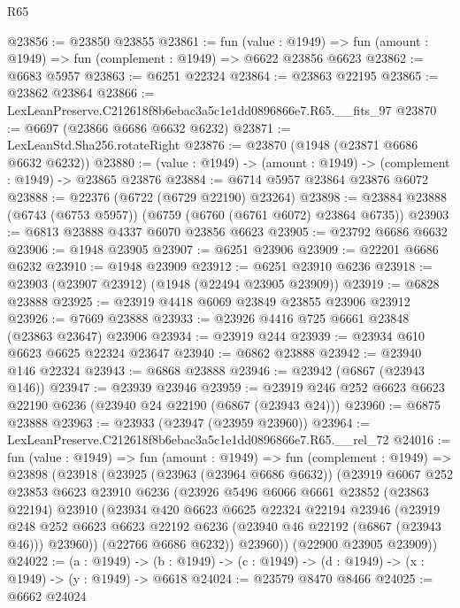 \begin{lexlean}{R65}
\begin{coremodule}
{@23856 := @23850 @23855
@23861 := fun (value : @1949) =>
  fun (amount : @1949) => fun (complement : @1949) => @6622 @23856 @6623
@23862 := @6683 @5957
@23863 := @6251 @22324
@23864 := @23863 @22195
@23865 := @23862 @23864
@23866 := LexLeanPreserve.C212618f8b6ebac3a5c1e1dd0896866e7.R65.__fits_97
@23870 := @6697 (@23866 @6686 @6632 @6232)
@23871 := LexLeanStd.Sha256.rotateRight
@23876 := @23870 (@1948 (@23871 @6686 @6632 @6232))
@23880 := (value : @1949) -> (amount : @1949) -> (complement : @1949) -> @23865 @23876
@23884 := @6714 @5957 @23864 @23876 @6072
@23888 := @22376 (@6722 (@6729 @22190) @23264)
@23898 := @23884 @23888 (@6743 (@6753 @5957)) (@6759 (@6760 (@6761 @6072) @23864 @6735))
@23903 := @6813 @23888 @4337 @6070 @23856 @6623
@23905 := @23792 @6686 @6632
@23906 := @1948 @23905
@23907 := @6251 @23906
@23909 := @22201 @6686 @6232
@23910 := @1948 @23909
@23912 := @6251 @23910 @6236
@23918 := @23903 (@23907 @23912) (@1948 (@22494 @23905 @23909))
@23919 := @6828 @23888
@23925 := @23919 @4418 @6069 @23849 @23855 @23906 @23912
@23926 := @7669 @23888
@23933 := @23926 @4416 @725 @6661 @23848 (@23863 @23647) @23906
@23934 := @23919 @244
@23939 := @23934 @610 @6623 @6625 @22324 @23647
@23940 := @6862 @23888
@23942 := @23940 @146 @22324
@23943 := @6868 @23888
@23946 := @23942 (@6867 (@23943 @146))
@23947 := @23939 @23946
@23959 := @23919 @246 @252 @6623 @6623 @22190 @6236 (@23940 @24 @22190 (@6867 (@23943 @24)))
@23960 := @6875 @23888
@23963 := @23933 (@23947 (@23959 @23960))
@23964 := LexLeanPreserve.C212618f8b6ebac3a5c1e1dd0896866e7.R65.__rel_72
@24016 := fun (value : @1949) =>
  fun (amount : @1949) =>
  fun (complement : @1949) =>
  @23898
    (@23918
      (@23925
        (@23963 (@23964 @6686 @6632))
        (@23919
          @6067
          @252
          @23853
          @6623
          @23910
          @6236
          (@23926
            @5496
            @6066
            @6661
            @23852
            (@23863 @22194)
            @23910
            (@23934
              @420
              @6623
              @6625
              @22324
              @22194
              @23946
              (@23919
                @248
                @252
                @6623
                @6623
                @22192
                @6236
                (@23940 @46 @22192 (@6867 (@23943 @46)))
                @23960))
            (@22766 @6686 @6232))
          @23960))
      (@22900 @23905 @23909))
@24022 := (a : @1949) ->
  (b : @1949) -> (c : @1949) -> (d : @1949) -> (x : @1949) -> (y : @1949) -> @6618
@24024 := @23579 @8470 @8466
@24025 := @6662 @24024
}
\end{coremodule}
\end{lexlean}
